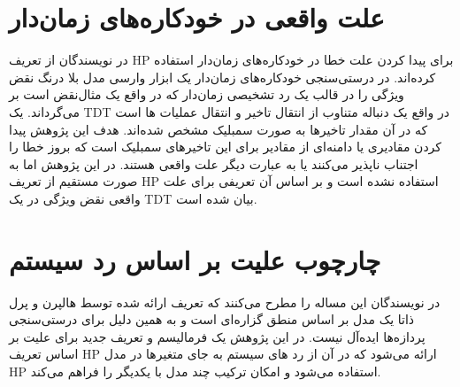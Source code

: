 \section{علت واقعی در خودکاره‌های زمان‌دار}
در
\cite{kolbl2020dynamic}
نویسندگان از تعریف 
HP
برای پیدا کردن علت خطا در خودکاره‌های زمان‌دار
استفاده کرده‌اند.
در درستی‌سنجی خودکاره‌های زمان‌دار یک ابزار وارسی مدل بلا درنگ نقض ویژگی‌ را در قالب یک رد تشخیصی زمان‌دار 
که در واقع یک مثال‌نقض است بر می‌گرداند.
یک 
TDT
در واقع یک دنباله متناوب از انتقال تاخیر
و
انتقال عملیات
ها است که در آن مقدار تاخیر‌ها به صورت سمبلیک مشخص شده‌اند.
هدف این پژوهش پیدا کردن مقادیری یا دامنه‌ای از مقادیر برای این تاخیر‌های سمبلیک است که بروز خطا را اجتناب ناپذیر می‌کنند یا به عبارت دیگر علت واقعی هستند.
در این پژوهش اما به صورت مستقیم از تعریف 
HP
استفاده نشده است و بر اساس آن تعریفی برای علت واقعی نقض ویژگی در یک 
TDT
بیان شده است.

\section{چارچوب علیت بر اساس رد سیستم}
در 
\cite{gossler2013general}
نویسندگان این مساله را مطرح می‌کنند که تعریف ارائه شده توسط هالپرن و پرل ذاتا یک مدل بر اساس منطق گزاره‌ای
است و به همین دلیل برای درستی‌سنجی پردازه‌ها ایده‌آل نیست.
در این پژوهش یک فرمالیسم و تعریف جدید برای علیت بر اساس تعریف 
HP
ارائه می‌شود که در آن از رد‌
های سیستم به جای متغیر‌ها در مدل 
HP
استفاده می‌شود و امکان ترکیب
چند مدل با یکدیگر را فراهم می‌کند.


